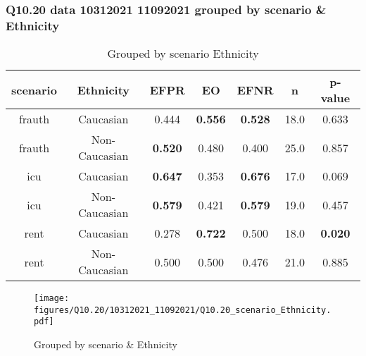 \subsubsection{Q10.20 data 10312021 11092021 grouped by scenario \& Ethnicity}

\begin{comment}
                             EFPR        EO      EFNR     n    pvalue
(frauth, Caucasian)      0.444444  0.555556  0.527778  18.0  0.633124
(frauth, Non-Caucasian)  0.520000  0.480000  0.400000  25.0  0.857193
(icu, Caucasian)         0.647059  0.352941  0.676471  17.0  0.069154
(icu, Non-Caucasian)     0.578947  0.421053  0.578947  19.0  0.457470
(rent, Caucasian)        0.277778  0.722222  0.500000  18.0  0.019675
(rent, Non-Caucasian)    0.500000  0.500000  0.476190  21.0  0.885234
\end{comment}

\begin{table}[h]
    \centering
    \begin{tabular}{|c|c|c|c|c|c|c|}
        \hline
        scenario & Ethnicity & EFPR & EO & EFNR & n & p-value\\
        \hline
        frauth & Caucasian & 0.444 & \textbf{0.556} & \textbf{0.528} & 18.0 & 0.633\\
		frauth & Non-Caucasian & \textbf{0.520} & 0.480 & 0.400 & 25.0 & 0.857\\
		icu & Caucasian & \textbf{0.647} & 0.353 & \textbf{0.676} & 17.0 & 0.069\\
		icu & Non-Caucasian & \textbf{0.579} & 0.421 & \textbf{0.579} & 19.0 & 0.457\\
		rent & Caucasian & 0.278 & \textbf{0.722} & 0.500 & 18.0 & \textbf{0.020}\\
		rent & Non-Caucasian & 0.500 & 0.500 & 0.476 & 21.0 & 0.885\\
		
        \hline
    \end{tabular}
    \caption{Grouped by scenario Ethnicity}
    \label{tab:my_label}
\end{table}
\begin{figure}[h]
    \centering
    \texttt{[image: figures/Q10.20/10312021\_11092021/Q10.20\_scenario\_Ethnicity.pdf]}
    \caption{Grouped by scenario \& Ethnicity}
    \label{fig:my_label}
\end{figure}
